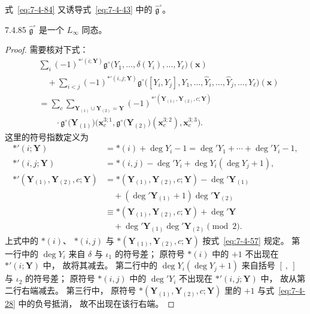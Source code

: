
式~\eqref{eq:7-4-84}
又诱导式~\eqref{eq:7-4-43}
中的
$\widehat{\mathfrak g}^{\circ}$。

\begin{proposition}{7.4.85}\label{prop:7-4-85}
$\widehat{\mathfrak g}^{\circ}$
是一个 $L_\infty$ 同态。
\end{proposition}

\begin{proof}
需要核对下式：
\begin{equation}
\begin{aligned}
&\sum_i
(-1)^{*'(i;\mathbf Y)}
\mathfrak g^{\circ}
\bigl(
Y_1,\ldots,\delta(Y_i),\ldots,Y_\ell
\bigr)(\mathbf x)\\
&\quad+
\sum_{i<j}
(-1)^{*'(i,j;\mathbf Y)}
\mathfrak g^{\circ}
\bigl(
[Y_i,Y_j],Y_1,\ldots,
\widehat Y_i,\ldots,
\widehat Y_j,\ldots,Y_\ell
\bigr)(\mathbf x)\\
&=
\sum_c
\sum_{\mathbf Y_{(1)}
\cup\mathbf Y_{(2)}=\mathbf Y}
(-1)^{
*'(\mathbf Y_{(1)},\mathbf Y_{(2)},c;\mathbf Y)
}\\[-0.4ex]
&\qquad\cdot
\mathfrak g^{\circ}
\bigl(\mathbf Y_{(1)}\bigr)
\bigl(
\mathbf x_c^{3;1},
\mathfrak g^{\circ}
\bigl(\mathbf Y_{(2)}\bigr)
(\mathbf x_c^{3;2}),
\mathbf x_c^{3;3}
\bigr).
\end{aligned}
\tag{7.4.86}\label{eq:7-4-86}
\end{equation}
这里的符号指数定义为
\[
\begin{aligned}
*'(i;\mathbf Y)
&=*(i)+\deg Y_i-1
=\deg'Y_1+\cdots+\deg'Y_i-1,\\
*'(i,j;\mathbf Y)
&=*(i,j)-\deg'Y_i
+\deg Y_i(\deg Y_j+1),\\
*'(\mathbf Y_{(1)},\mathbf Y_{(2)},c;\mathbf Y)
&=*(\mathbf Y_{(1)},\mathbf Y_{(2)},c;\mathbf Y)
-\deg'\mathbf Y_{(1)}\\
&\quad+
(\deg'\mathbf Y_{(1)}+1)\deg'\mathbf Y_{(2)}\\
&\equiv
*(\mathbf Y_{(1)},\mathbf Y_{(2)},c;\mathbf Y)
+\deg'\mathbf Y\\
&\quad+
\deg'\mathbf Y_{(1)}
\deg'\mathbf Y_{(2)}
\pmod 2.
\end{aligned}
\]
上式中的
$*(i)$、
$*(i,j)$ 与
$*(\mathbf Y_{(1)},\mathbf Y_{(2)},c;\mathbf Y)$
按式~\eqref{eq:7-4-57}
规定。
第一行中的
$\deg Y_i$
来自 $\delta$ 与
$\iota_1$ 的符号差；
原符号 $*(i)$ 中的 $+1$
不出现在 $*'(i;\mathbf Y)$ 中，
故将其减去。
第二行中的
$\deg Y_i(\deg Y_j+1)$
来自括号 $[\ ,\ ]$
与 $\iota_2$ 的符号差；
原符号 $*(i,j)$ 中的
$\deg'Y_i$
不出现在
$*'(i,j;\mathbf Y)$ 中，
故从第二行右端减去。
第三行中，
原符号
$*(\mathbf Y_{(1)},\mathbf Y_{(2)},c;\mathbf Y)$
里的 $+1$
与式~\eqref{eq:7-4-28}
中的负号抵消，
故不出现在该行右端。


\end{proof}
